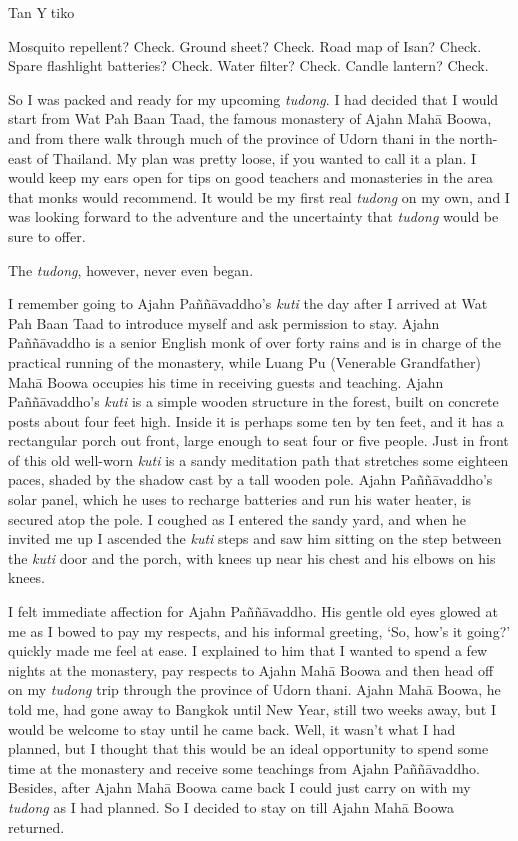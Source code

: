 
Tan Ytiko

Mosquito repellent? Check. Ground sheet? Check. Road map of Isan? Check.
Spare flashlight batteries? Check. Water filter? Check. Candle lantern?
Check.

So I was packed and ready for my upcoming \emph{tudong}. I had decided
that I would start from Wat Pah Baan Taad, the famous monastery of Ajahn
Mahā Boowa, and from there walk through much of the province of Udorn
thani in the north-east of Thailand. My plan was pretty loose, if you
wanted to call it a plan. I would keep my ears open for tips on good
teachers and monasteries in the area that monks would recommend. It
would be my first real \emph{tudong} on my own, and I was looking
forward to the adventure and the uncertainty that \emph{tudong} would be
sure to offer.

The \emph{tudong}, however, never even began.

I remember going to Ajahn Paññāvaddho's \emph{kuti} the day after I
arrived at Wat Pah Baan Taad to introduce myself and ask permission to
stay. Ajahn Paññāvaddho is a senior English monk of over forty rains and
is in charge of the practical running of the monastery, while Luang Pu
(Venerable Grandfather) Mahā Boowa occupies his time in receiving guests
and teaching. Ajahn Paññāvaddho's \emph{kuti} is a simple wooden
structure in the forest, built on concrete posts about four feet high.
Inside it is perhaps some ten by ten feet, and it has a rectangular
porch out front, large enough to seat four or five people. Just in front
of this old well-worn \emph{kuti} is a sandy meditation path that
stretches some eighteen paces, shaded by the shadow cast by a tall
wooden pole. Ajahn Paññāvaddho's solar panel, which he uses to recharge
batteries and run his water heater, is secured atop the pole. I coughed
as I entered the sandy yard, and when he invited me up I ascended the
\emph{kuti} steps and saw him sitting on the step between the
\emph{kuti} door and the porch, with knees up near his chest and his
elbows on his knees.

I felt immediate affection for Ajahn Paññāvaddho. His gentle old eyes
glowed at me as I bowed to pay my respects, and his informal greeting,
`So, how's it going?' quickly made me feel at ease. I explained to him
that I wanted to spend a few nights at the monastery, pay respects to
Ajahn Mahā Boowa and then head off on my \emph{tudong} trip through the
province of Udorn thani. Ajahn Mahā Boowa, he told me, had gone away to
Bangkok until New Year, still two weeks away, but I would be welcome to
stay until he came back. Well, it wasn't what I had planned, but I
thought that this would be an ideal opportunity to spend some time at
the monastery and receive some teachings from Ajahn Paññāvaddho.
Besides, after Ajahn Mahā Boowa came back I could just carry on with my
\emph{tudong} as I had planned. So I decided to stay on till Ajahn Mahā
Boowa returned.

